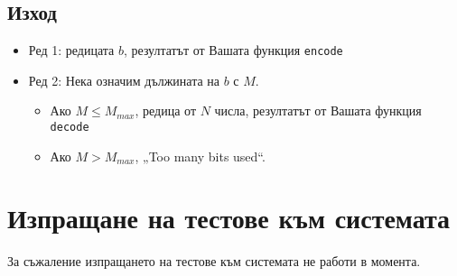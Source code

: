\documentclass[a4paper,11pt]{article}
\newcommand{\code}[1]{\texttt{#1}}
\newcommand{\noskip}{\vspace{-\parskip}}
\begin{document}
\subsection*{Изход}
\noskip
\begin{itemize}
    \item Ред 1: редицата $b$, резултатът от Вашата функция \code{encode}
    \item Ред 2: Нека означим дължината на $b$ с $M$.
    \begin{itemize}
        \item Ако $M \leq M_{max}$, редица от $N$ числа,
            резултатът от Вашата функция \code{decode}
        \item Ако $M > M_{max}$, „Too many bits used“.
    \end{itemize}
\end{itemize}

\section*{Изпращане на тестове към системата}
За съжаление изпращането на тестове към системата не работи в момента.
\end{document}
